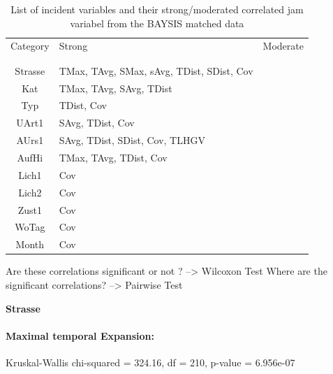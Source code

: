 \documentclass[a4paper,headsepline,footsepline,fontsize=11pt,BCOR=12mm,DIV=12]{report}
\begin{document}
\noindent
\begin{table}[h!]
	\centering
	\begin{tabular}{c|l|l}  
		Category & Strong & Moderate \\
		\\[-1em]
		\hline
		\\[-1em]
		Strasse & TMax, TAvg, SMax, sAvg, TDist, SDist, Cov & \\ 
 		Kat & TMax, TAvg, SAvg, TDist & \\ 
 		Typ & TDist, Cov & \\
 		UArt1 & SAvg, TDist, Cov & \\
 		AUrs1 & SAvg, TDist, SDist, Cov, TLHGV & \\
 		AufHi & TMax, TAvg, TDist, Cov & \\
 		Lich1 & Cov & \\
 		Lich2 & Cov & \\
 		Zust1 & Cov & \\
 		WoTag & Cov & \\
 		Month & Cov & \\
	\end{tabular}
	\caption{List of incident variables and their strong/moderated correlated jam variabel from the BAYSIS matched data}
\end{table}

Are these correlations significant or not ? --> Wilcoxon Test
\smallskip
Where are the significant correlations? --> Pairwise Test

\large
\centerline{\textbf{Strasse}}
\normalsize

\paragraph{Maximal temporal Expansion:}

Kruskal-Wallis chi-squared = 324.16, df = 210, p-value = 6.956e-07
\end{document}

